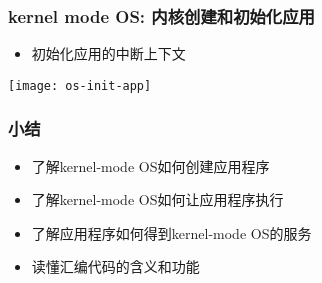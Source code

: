 \begin{frame}
    \frametitle{kernel mode OS: 内核创建和初始化应用}
    
    \begin{itemize}
        \item 初始化应用的中断上下文
    \end{itemize}	
    \centering
    \texttt{[image: os-init-app]}
\end{frame}
\begin{frame}
    \frametitle{小结}
    \begin{itemize}
        \item 了解kernel-mode OS如何创建应用程序
        \item 了解kernel-mode OS如何让应用程序执行
        \item 了解应用程序如何得到kernel-mode OS的服务
        \item 读懂汇编代码的含义和功能
    \end{itemize}
\end{frame}
%
%
%
%		
%		
%	
%
